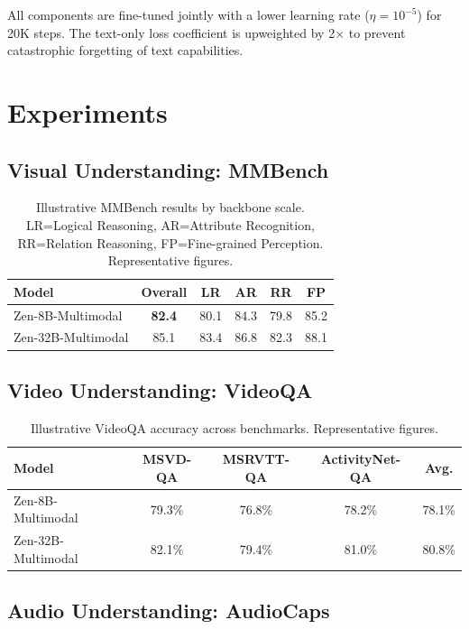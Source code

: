 \documentclass[11pt,a4paper]{article}
\begin{document}
All components are fine-tuned jointly with a lower learning rate ($\eta=10^{-5}$)
for 20K steps. The text-only loss coefficient is upweighted by 2$\times$ to
prevent catastrophic forgetting of text capabilities.

\section{Experiments}

\subsection{Visual Understanding: MMBench}

\begin{table}[H]
\centering
\begin{tabular}{lccccc}
\toprule
\textbf{Model} & \textbf{Overall} & \textbf{LR} & \textbf{AR} & \textbf{RR} & \textbf{FP} \\
\midrule
Zen-8B-Multimodal & \textbf{82.4} & 80.1 & 84.3 & 79.8 & 85.2 \\
Zen-32B-Multimodal & 85.1 & 83.4 & 86.8 & 82.3 & 88.1 \\
\bottomrule
\end{tabular}
\caption{Illustrative MMBench results by backbone scale. LR=Logical Reasoning, AR=Attribute Recognition, RR=Relation Reasoning, FP=Fine-grained Perception. Representative figures.}
\end{table}

\subsection{Video Understanding: VideoQA}

\begin{table}[H]
\centering
\begin{tabular}{lcccc}
\toprule
\textbf{Model} & \textbf{MSVD-QA} & \textbf{MSRVTT-QA} & \textbf{ActivityNet-QA} & \textbf{Avg.} \\
\midrule
Zen-8B-Multimodal & 79.3\% & 76.8\% & 78.2\% & 78.1\% \\
Zen-32B-Multimodal & 82.1\% & 79.4\% & 81.0\% & 80.8\% \\
\bottomrule
\end{tabular}
\caption{Illustrative VideoQA accuracy across benchmarks. Representative figures.}
\end{table}

\subsection{Audio Understanding: AudioCaps}
\end{document}
